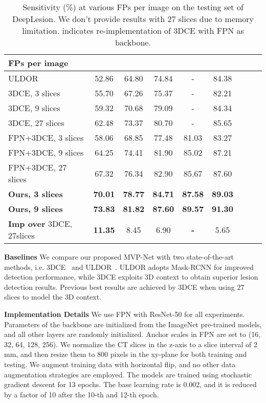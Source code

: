 \documentclass[runningheads]{llncs}
\begin{document}
\begin{table}[!htbp]
    \caption{Sensitivity (\%) at various FPs per image on the testing set of DeepLesion. We don't provide results with 27 slices due to memory limitation.  indicates re-implementation of 3DCE with FPN as backbone.}
    \label{tab1}
    \centering
    \footnotesize \setlength{\tabcolsep}{8pt}\renewcommand{\arraystretch}{1.2}\centering
        \label{tab:sample_1}
        \begin{tabular}{lcccccccc}
        \toprule
            \textbf{FPs per image} &  &  &  &  &  \\
\hline
            \hline
            ULDOR\cite{ULDOR} & 52.86 & 64.80 & 74.84 &-& 84.38 \\
            3DCE, 3 slices\cite{3DCE} & 55.70 & 67.26 & 75.37 &-& 82.21 \\
			3DCE, 9 slices\cite{3DCE} & 59.32 & 70.68 & 79.09 &-& 84.34 \\
			3DCE, 27 slices\cite{3DCE} & 62.48 & 73.37 & 80.70 &-& 85.65 \\
            \hline
            FPN+3DCE, 3 slices & 58.06 & 68.85 & 77.48 & 81.03 & 83.27 \\
            FPN+3DCE, 9 slices  &64.25 & 74.41 & 81.90 & 85.02 & 87.21 \\
            FPN+3DCE, 27 slices  & 67.32 & 76.34 & 82.90 & 85.67 & 87.60 \\
            \hline
            \textbf{Ours, 3 slices} & \textbf{70.01} & \textbf{78.77} & \textbf{84.71} & \textbf{87.58} & \textbf{89.03} \\
            \textbf{Ours, 9 slices} & \textbf{73.83} & \textbf{81.82} & \textbf{87.60} & \textbf{89.57} & \textbf{91.30} \\
            \hline
            \textbf{Imp over} 3DCE, 27slices\cite{3DCE} &  \textbf{11.35} & 8.45 & 6.90 & \textbf{-} & 5.65 \\
        \end{tabular}
\end{table}

\noindent\textbf{Baselines} We compare our proposed MVP-Net with two state-of-the-art methods, i.e. 3DCE~\cite{3DCE} and ULDOR~\cite{ULDOR}. ULDOR adopts Mask-RCNN for improved detection performance, while 3DCE exploits 3D context to obtain superior lesion detection results. Previous best results are achieved by 3DCE when using 27 slices to model the 3D context.

\noindent\textbf{Implementation Details}  We use FPN with ResNet-50 for all experiments. Parameters of the backbone are initialized from the ImageNet pre-trained models, and all other layers are randomly initialized. Anchor scales in FPN are set to (16, 32, 64, 128, 256). We normalize the CT slices in the z-axis to a slice interval of 2 mm, and then resize them to 800 pixels in the xy-plane for both training and testing. We augment training data with horizontal flip, and no other data augmentation strategies are employed. The models are trained using stochastic gradient descent for 13 epochs. The base learning rate is 0.002, and it is reduced by a factor of 10 after the 10-th and 12-th epoch.
\end{document}
